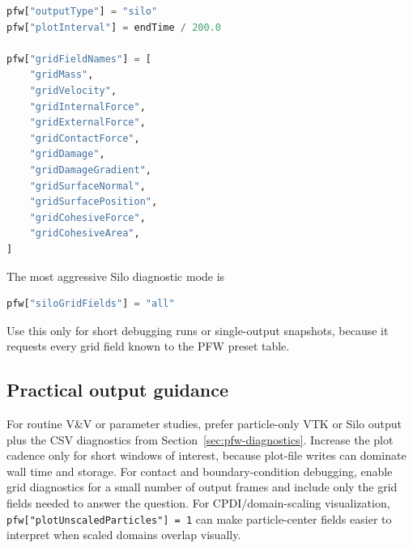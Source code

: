 \begin{lstlisting}[language=Python,caption={Silo output with explicit contact/cohesive grid diagnostics.}]
pfw["outputType"] = "silo"
pfw["plotInterval"] = endTime / 200.0

pfw["gridFieldNames"] = [
    "gridMass",
    "gridVelocity",
    "gridInternalForce",
    "gridExternalForce",
    "gridContactForce",
    "gridDamage",
    "gridDamageGradient",
    "gridSurfaceNormal",
    "gridSurfacePosition",
    "gridCohesiveForce",
    "gridCohesiveArea",
]
\end{lstlisting}

The most aggressive Silo diagnostic mode is
\begin{lstlisting}[language=Python,caption={One-line request for all PFW-known Silo grid fields.}]
pfw["siloGridFields"] = "all"
\end{lstlisting}
Use this only for short debugging runs or single-output snapshots, because it requests every grid field known to the PFW preset table.

\subsection{Practical output guidance}
\label{sec:pfw-output-guidance}

For routine V\&V or parameter studies, prefer particle-only VTK or Silo output plus the CSV diagnostics from Section~\ref{sec:pfw-diagnostics}.  Increase the plot cadence only for short windows of interest, because plot-file writes can dominate wall time and storage.  For contact and boundary-condition debugging, enable grid diagnostics for a small number of output frames and include only the grid fields needed to answer the question.  For CPDI/domain-scaling visualization, \texttt{pfw["plotUnscaledParticles"] = 1} can make particle-center fields easier to interpret when scaled domains overlap visually.

